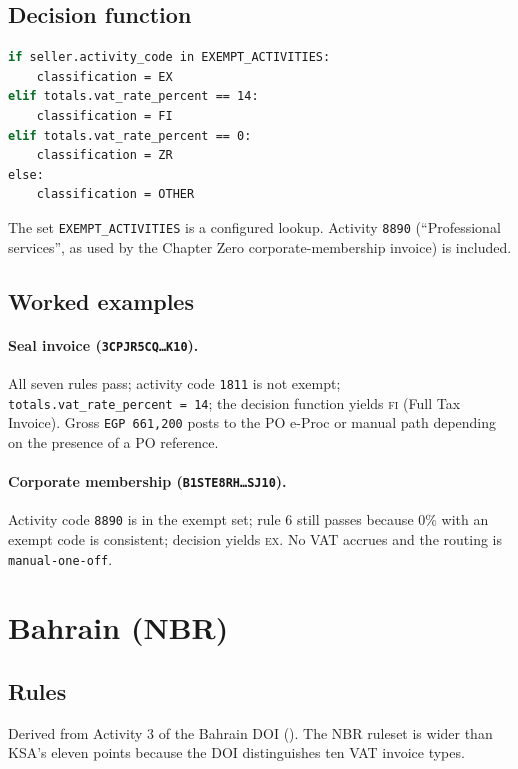 \subsection{Decision function}

\begin{lstlisting}[language=bash,basicstyle=\ttfamily\small]
if seller.activity_code in EXEMPT_ACTIVITIES:
    classification = EX
elif totals.vat_rate_percent == 14:
    classification = FI
elif totals.vat_rate_percent == 0:
    classification = ZR
else:
    classification = OTHER
\end{lstlisting}
The set \texttt{EXEMPT\_ACTIVITIES} is a configured lookup. Activity
\texttt{8890} (``Professional services'', as used by the Chapter Zero
corporate-membership invoice) is included.

\subsection{Worked examples}

\paragraph{Seal invoice (\texttt{3CPJR5CQ\ldots K10}).}
All seven rules pass; activity code \texttt{1811} is not exempt;
\texttt{totals.vat\_rate\_percent~=~14}; the decision function yields
\textsc{fi} (Full Tax Invoice). Gross \texttt{EGP~661{,}200} posts to
the PO e-Proc or manual path depending on the presence of a PO
reference.

\paragraph{Corporate membership (\texttt{B1STE8RH\ldots SJ10}).}
Activity code \texttt{8890} is in the exempt set; rule 6 still passes
because 0\% with an exempt code is consistent; decision yields \textsc{ex}.
No VAT accrues and the routing is \texttt{manual-one-off}.

\section{Bahrain (NBR)}

\subsection{Rules}

Derived from Activity 3 of the Bahrain DOI
(\corpus{}). The
NBR ruleset is wider than KSA's eleven points because the DOI
distinguishes ten VAT invoice types.

